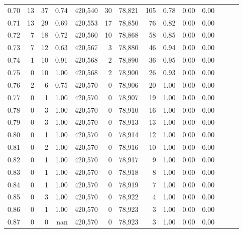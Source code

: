 \begin{tabular}{rrrrrrrrrrrrrr}
0.70 &      13 &     37 &  0.74 &  420,540 &       30 &  78,821 &     105 &  0.78 &  0.00 &      0.00 \\
0.71 &      13 &     29 &  0.69 &  420,553 &       17 &  78,850 &      76 &  0.82 &  0.00 &      0.00 \\
0.72 &       7 &     18 &  0.72 &  420,560 &       10 &  78,868 &      58 &  0.85 &  0.00 &      0.00 \\
0.73 &       7 &     12 &  0.63 &  420,567 &        3 &  78,880 &      46 &  0.94 &  0.00 &      0.00 \\
0.74 &       1 &     10 &  0.91 &  420,568 &        2 &  78,890 &      36 &  0.95 &  0.00 &      0.00 \\
0.75 &       0 &     10 &  1.00 &  420,568 &        2 &  78,900 &      26 &  0.93 &  0.00 &      0.00 \\
0.76 &       2 &      6 &  0.75 &  420,570 &        0 &  78,906 &      20 &  1.00 &  0.00 &      0.00 \\
0.77 &       0 &      1 &  1.00 &  420,570 &        0 &  78,907 &      19 &  1.00 &  0.00 &      0.00 \\
0.78 &       0 &      3 &  1.00 &  420,570 &        0 &  78,910 &      16 &  1.00 &  0.00 &      0.00 \\
0.79 &       0 &      3 &  1.00 &  420,570 &        0 &  78,913 &      13 &  1.00 &  0.00 &      0.00 \\
0.80 &       0 &      1 &  1.00 &  420,570 &        0 &  78,914 &      12 &  1.00 &  0.00 &      0.00 \\
0.81 &       0 &      2 &  1.00 &  420,570 &        0 &  78,916 &      10 &  1.00 &  0.00 &      0.00 \\
0.82 &       0 &      1 &  1.00 &  420,570 &        0 &  78,917 &       9 &  1.00 &  0.00 &      0.00 \\
0.83 &       0 &      1 &  1.00 &  420,570 &        0 &  78,918 &       8 &  1.00 &  0.00 &      0.00 \\
0.84 &       0 &      1 &  1.00 &  420,570 &        0 &  78,919 &       7 &  1.00 &  0.00 &      0.00 \\
0.85 &       0 &      3 &  1.00 &  420,570 &        0 &  78,922 &       4 &  1.00 &  0.00 &      0.00 \\
0.86 &       0 &      1 &  1.00 &  420,570 &        0 &  78,923 &       3 &  1.00 &  0.00 &      0.00 \\
0.87 &       0 &      0 &   nan &  420,570 &        0 &  78,923 &       3 &  1.00 &  0.00 &      0.00 \\

\end{tabular}
